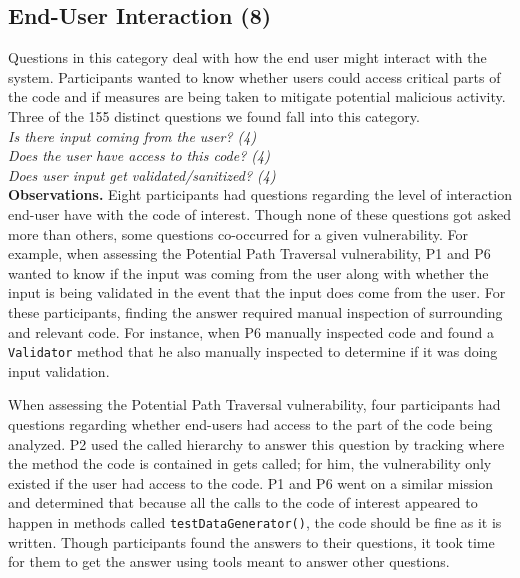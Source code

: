 \documentclass[conference]{IEEEtran}
\begin{document}

\noindent\subsection{\textbf{End-User Interaction (8)}}
\label{eui}


Questions in this category deal with how the end user might interact with the system. 
Participants wanted to know whether users could access critical parts of the code and if measures are being taken to mitigate potential malicious activity. 
Three of the 155 distinct questions we found fall into this category.
\\

\noindent\emph{Is there input coming from the user? (4)} \\
\emph{Does the user have access to this code? (4)} \\
\emph{Does user input get validated/sanitized? (4)} \\


\noindent\textbf{Observations.}
Eight participants had questions regarding the level of interaction end-user have with the code of interest. 
Though none of these questions got asked more than others, some questions co-occurred for a given vulnerability.
For example, when assessing the Potential Path Traversal vulnerability, P1 and P6 wanted to know if the input was coming from the user along with whether the input is being validated in the event that the input does come from the user.
For these participants, finding the answer required manual inspection of surrounding and relevant code. 
For instance, when P6 manually inspected code and found a \texttt{Validator} method that he also manually inspected to determine if it was doing input validation.

When assessing the Potential Path Traversal vulnerability, four participants had questions regarding whether end-users had access to the part of the code being analyzed.
P2 used the called hierarchy to answer this question by tracking where the method the code is contained in gets called; for him, the vulnerability only existed if the user had access to the code.
P1 and P6 went on a similar mission and determined that because all the calls to the code of interest appeared to happen in methods called \texttt{testDataGenerator()}, the code should be fine as it is written.
Though participants found the answers to their questions, it took time for them to get the answer using tools meant to answer other questions.
\\
\end{document}
